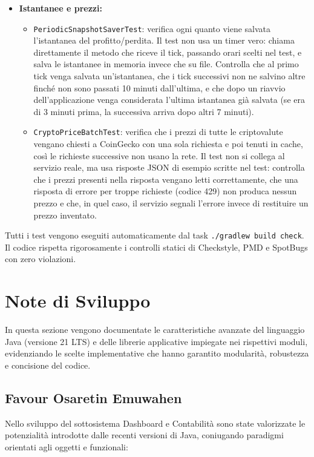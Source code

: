 \documentclass[11pt,a4paper,openright]{report}
\begin{document}
\begin{itemize}
\begin{itemize}
    \end{itemize}
    \item \textbf{Istantanee e prezzi:}
    \begin{itemize}
        \item \texttt{PeriodicSnapshotSaverTest}: verifica ogni quanto viene salvata l'istantanea del profitto/perdita. Il test non usa un timer vero: chiama direttamente il metodo che riceve il tick, passando orari scelti nel test, e salva le istantanee in memoria invece che su file. Controlla che al primo tick venga salvata un'istantanea, che i tick successivi non ne salvino altre finché non sono passati 10 minuti dall'ultima, e che dopo un riavvio dell'applicazione venga considerata l'ultima istantanea già salvata (se era di 3 minuti prima, la successiva arriva dopo altri 7 minuti).
        \item \texttt{CryptoPriceBatchTest}: verifica che i prezzi di tutte le criptovalute vengano chiesti a CoinGecko con una sola richiesta e poi tenuti in cache, così le richieste successive non usano la rete. Il test non si collega al servizio reale, ma usa risposte JSON di esempio scritte nel test: controlla che i prezzi presenti nella risposta vengano letti correttamente, che una risposta di errore per troppe richieste (codice 429) non produca nessun prezzo e che, in quel caso, il servizio segnali l'errore invece di restituire un prezzo inventato.
    \end{itemize}
\end{itemize}

Tutti i test vengono eseguiti automaticamente dal task \texttt{./gradlew build check}. Il codice rispetta rigorosamente i controlli statici di Checkstyle, PMD e SpotBugs con zero violazioni.

\section{Note di Sviluppo}

In questa sezione vengono documentate le caratteristiche avanzate del linguaggio Java (versione 21 LTS) e delle librerie applicative impiegate nei rispettivi moduli, evidenziando le scelte implementative che hanno garantito modularità, robustezza e concisione del codice.

\subsection{Favour Osaretin Emuwahen}

Nello sviluppo del sottosistema Dashboard e Contabilità sono state valorizzate le potenzialità introdotte dalle recenti versioni di Java, coniugando paradigmi orientati agli oggetti e funzionali:
\end{document}
